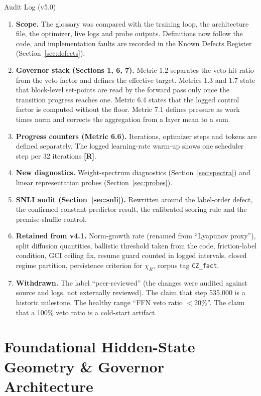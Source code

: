 \documentclass[11pt,a4paper]{article}
\newcommand{\sR}{\textbf{[R]}}
\begin{document}
\begin{logbox}{Audit Log (v5.0)}
\begin{enumerate}[leftmargin=*]
    \item \textbf{Scope.} The glossary was compared with the training loop, the architecture file, the optimizer, live logs and probe outputs. Definitions now follow the code, and implementation faults are recorded in the Known Defects Register (Section~\ref{sec:defects}).
    \item \textbf{Governor stack (Sections 1, 6, 7).} Metric 1.2 separates the veto hit ratio from the veto factor and defines the effective target. Metrics 1.3 and 1.7 state that block-level set-points are read by the forward pass only once the transition progress reaches one. Metric 6.4 states that the logged control factor is computed without the floor. Metric 7.1 defines pressure as work times norm and corrects the aggregation from a layer mean to a sum.
    \item \textbf{Progress counters (Metric 6.6).} Iterations, optimizer steps and tokens are defined separately. The logged learning-rate warm-up shows one scheduler step per 32 iterations \sR{}.
    \item \textbf{New diagnostics.} Weight-spectrum diagnostics (Section~\ref{sec:spectra}) and linear representation probes (Section~\ref{sec:probes}).
    \item \textbf{SNLI audit (Section~\ref{sec:snli}).} Rewritten around the label-order defect, the confirmed constant-predictor result, the calibrated scoring rule and the premise-shuffle control.
    \item \textbf{Retained from v4.1.} Norm-growth rate (renamed from ``Lyapunov proxy''), split diffusion quantities, ballistic threshold taken from the code, friction-label condition, GCI ceiling fix, resume guard counted in logged intervals, closed regime partition, persistence criterion for $\chi_R$, corpus tag \texttt{CZ\_fact}.
    \item \textbf{Withdrawn.} The label ``peer-reviewed'' (the changes were audited against source and logs, not externally reviewed). The claim that step 535{,}000 is a historic milestone. The healthy range ``FFN veto ratio $<20\%$''. The claim that a 100\% veto ratio is a cold-start artifact.
\end{enumerate}
\end{logbox}

\newpage


\section{Foundational Hidden-State Geometry \& Governor Architecture}
\end{document}
